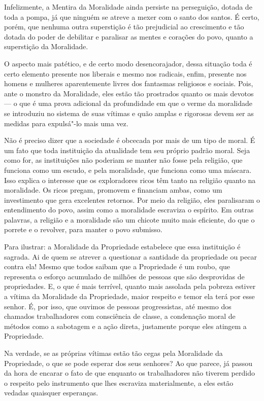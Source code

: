 Infelizmente, a Mentira da Moralidade ainda persiste na perseguição,
dotada de toda a pompa, já que ninguém se atreve a mexer com o santo dos
santos. É certo, porém, que nenhuma outra superstição é tão prejudicial
ao crescimento e tão dotada do poder de debilitar e paralisar as mentes
e corações do povo, quanto a superstição da Moralidade.

O aspecto mais patético, e de certo modo desencorajador, dessa situação
toda é certo elemento presente nos liberais e mesmo nos radicais, enfim,
presente nos homens e mulheres aparentemente livres dos fantasmas
religiosos e sociais. Pois, ante o monstro da Moralidade, eles estão tão
prostrados quanto os mais devotos --- o que é uma prova adicional da
profundidade em que o verme da moralidade se introduziu no sistema de
suas vítimas e quão amplas e rigorosas devem ser as medidas para
expulsá"-lo mais uma vez.

Não é preciso dizer que a sociedade é obcecada por mais de um tipo de
moral. É um fato que toda instituição da atualidade tem seu próprio
padrão moral. Seja como for, as instituições não poderiam se manter não
fosse pela religião, que funciona como um escudo, e pela moralidade, que
funciona como uma máscara. Isso explica o interesse que os exploradores
ricos têm tanto na religião quanto na moralidade. Os ricos pregam,
promovem e financiam ambas, como um investimento que gera excelentes
retornos. Por meio da religião, eles paralisaram o entendimento do povo,
assim como a moralidade escraviza o espírito. Em outras palavras, a
religião e a moralidade são um chicote muito mais eficiente, do que o
porrete e o revolver, para manter o povo submisso.

Para ilustrar: a Moralidade da Propriedade estabelece que essa
instituição é sagrada. Ai de quem se atrever a questionar a santidade da
propriedade ou pecar contra ela! Mesmo que todos saibam que a
Propriedade é um roubo, que representa o esforço acumulado de milhões de
pessoas que são desprovidas de propriedades. E, o que é mais terrível,
quanto mais assolada pela pobreza estiver a vítima da Moralidade da
Propriedade, maior respeito e temor ela terá por esse senhor. É, por
isso, que ouvimos de pessoas progressistas, até mesmo dos chamados
trabalhadores com consciência de classe, a condenação moral de métodos
como a sabotagem e a ação direta, justamente porque eles atingem a
Propriedade.

Na verdade, se as próprias vítimas estão tão cegas pela Moralidade da
Propriedade, o que se pode esperar dos seus senhores? Ao que parece, já
passou da hora de encarar o fato de que enquanto os trabalhadores não
tiverem perdido o respeito pelo instrumento que lhes escraviza
materialmente, a eles estão vedadas quaisquer esperanças.

